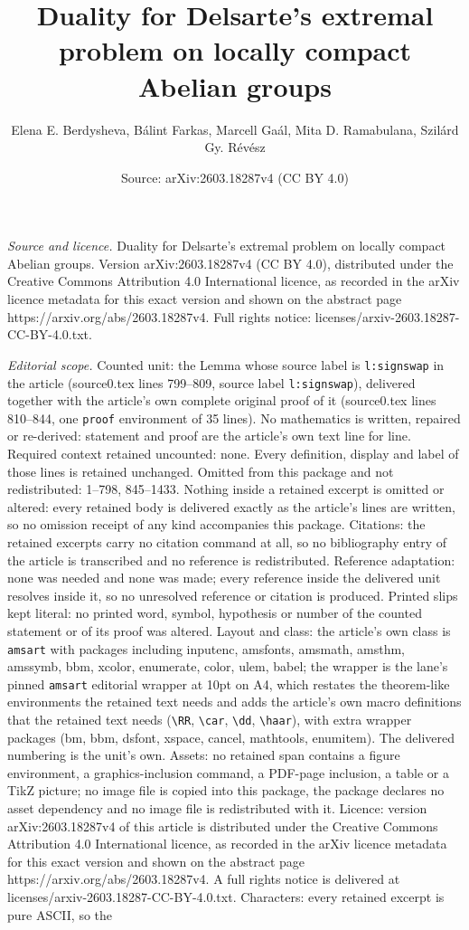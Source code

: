 \documentclass[10pt,a4paper]{amsart}
\title[Duality for Delsarte's extremal problem on locally compact A]{Duality for Delsarte's extremal problem on locally compact Abelian groups}
\author{Elena E. Berdysheva, B\'alint Farkas, Marcell Ga\'al, Mita D. Ramabulana, Szil\'ard Gy. R\'ev\'esz}
\date{Source: arXiv:2603.18287v4 (CC BY 4.0)}
\begin{document}
\maketitle

\noindent\emph{Source and licence.} Duality for Delsarte's extremal problem on locally compact Abelian groups. Version arXiv:2603.18287v4 (CC BY 4.0), distributed under the Creative Commons Attribution 4.0 International licence, as recorded in the arXiv licence metadata for this exact version and shown on the abstract page https://arxiv.org/abs/2603.18287v4. Full rights notice: licenses/arxiv-2603.18287-CC-BY-4.0.txt.\par\smallskip

\noindent\textit{Editorial scope.} Counted unit: the Lemma whose source label is \texttt{l:signswap} in the article (source0.tex lines 799--809, source label \texttt{l:signswap}), delivered together with the article's own complete original proof of it (source0.tex lines 810--844, one \texttt{proof} environment of 35 lines). No mathematics is written, repaired or re-derived: statement and proof are the article's own text line for line. Required context retained uncounted: none. Every definition, display and label of those lines is retained unchanged. Omitted from this package and not redistributed: 1--798, 845--1433. Nothing inside a retained excerpt is omitted or altered: every retained body is delivered exactly as the article's lines are written, so no omission receipt of any kind accompanies this package. Citations: the retained excerpts carry no citation command at all, so no bibliography entry of the article is transcribed and no reference is redistributed. Reference adaptation: none was needed and none was made; every reference inside the delivered unit resolves inside it, so no unresolved reference or citation is produced. Printed slips kept literal: no printed word, symbol, hypothesis or number of the counted statement or of its proof was altered. Layout and class: the article's own class is \texttt{amsart} with packages including inputenc, amsfonts, amsmath, amsthm, amssymb, bbm, xcolor, enumerate, color, ulem, babel; the wrapper is the lane's pinned \texttt{amsart} editorial wrapper at 10pt on A4, which restates the theorem-like environments the retained text needs and adds the article's own macro definitions that the retained text needs (\texttt{\textbackslash RR}, \texttt{\textbackslash car}, \texttt{\textbackslash dd}, \texttt{\textbackslash haar}), with extra wrapper packages (bm, bbm, dsfont, xspace, cancel, mathtools, enumitem). The delivered numbering is the unit's own. Assets: no retained span contains a figure environment, a graphics-inclusion command, a PDF-page inclusion, a table or a TikZ picture; no image file is copied into this package, the package declares no asset dependency and no image file is redistributed with it. Licence: version arXiv:2603.18287v4 of this article is distributed under the Creative Commons Attribution 4.0 International licence, as recorded in the arXiv licence metadata for this exact version and shown on the abstract page https://arxiv.org/abs/2603.18287v4. A full rights notice is delivered at licenses/arxiv-2603.18287-CC-BY-4.0.txt. Characters: every retained excerpt is pure ASCII, so the 
\end{document}

